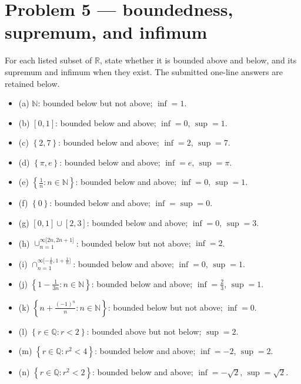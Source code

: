 \section{Problem 5 --- boundedness, supremum, and infimum}

For each listed subset of \(\mathbb{R}\), state whether it is bounded above and below, and its supremum and infimum when they exist. The submitted one-line answers are retained below.

\begin{itemize}
\tightlist
\item
  (a) \(\mathbb{N}\): bounded below but not above; \(\inf = 1\).
\item
  (b) \(\left\lbrack {0,1} \right\rbrack\): bounded below and above; \(\inf = 0\), \(\sup = 1\).
\item
  (c) \(\left\{ {2,7} \right\}\): bounded below and above; \(\inf = 2\), \(\sup = 7\).
\item
  (d) \(\left\{ {\pi,e} \right\}\): bounded below and above; \(\inf = e\), \(\sup = \pi\).
\item
  (e) \(\left\{ {\frac{1}{n}:n \in \mathbb{N}} \right\}\): bounded below and above; \(\inf = 0\), \(\sup = 1\).
\item
  (f) \(\left\{ 0 \right\}\): bounded below and above; \(\inf = \sup = 0\).
\item
  (g) \(\left\lbrack {0,1} \right\rbrack \cup \left\lbrack {2,3} \right\rbrack\): bounded below and above; \(\inf = 0\), \(\sup = 3\).
\item
  (h) \(\cup_{n = 1}^{\infty{\lbrack{2n,2n + 1}\rbrack}}\): bounded below but not above; \(\inf = 2\).
\item
  (i) \(\cap_{n = 1}^{\infty{\lbrack{- \frac{1}{n},1 + \frac{1}{n}}\rbrack}}\): bounded below and above; \(\inf = 0\), \(\sup = 1\).
\item
  (j) \(\left\{ {1 - \frac{1}{3n}:n \in \mathbb{N}} \right\}\): bounded below and above; \(\inf = \frac{2}{3}\), \(\sup = 1\).
\item
  (k) \(\left\{ {n + \frac{\left( {- 1} \right)^{n}}{n}:n \in \mathbb{N}} \right\}\): bounded below but not above; \(\inf = 0\).
\item
  (l) \(\left\{ {r \in \mathbb{Q}:r < 2} \right\}\): bounded above but not below; \(\sup = 2\).
\item
  (m) \(\left\{ {r \in \mathbb{Q}:r^{2} < 4} \right\}\): bounded below and above; \(\inf = - 2\), \(\sup = 2\).
\item
  (n) \(\left\{ {r \in \mathbb{Q}:r^{2} < 2} \right\}\): bounded below and above; \(\inf = - \sqrt{2}\), \(\sup = \sqrt{2}\).

\end{itemize}
